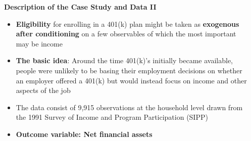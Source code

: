 \begin{frame}[fragile]
\begin{columns}
\begin{column}{0.3\textwidth}
\end{column}
\begin{column}{0.7\textwidth}
\textbf{Description of the Case Study and Data II}
\begin{itemize}
\small
\item \textbf{Eligibility} for enrolling in a 401(k) plan might be taken as \textbf{exogenous after conditioning} on a few observables of which the most important may be income
\item \textbf{The basic idea}:  Around the time 401(k)’s initially became available, people were unlikely to be basing their employment decisions on whether an employer offered a 401(k) but would instead focus on income and other aspects of the job
\item The data consist of 9,915 observations at the household level drawn from the 1991 Survey of Income and Program Participation (SIPP)
\item \textbf{Outcome variable: Net financial assets}
\end{itemize}
\end{column}
\end{columns}
\end{frame}

